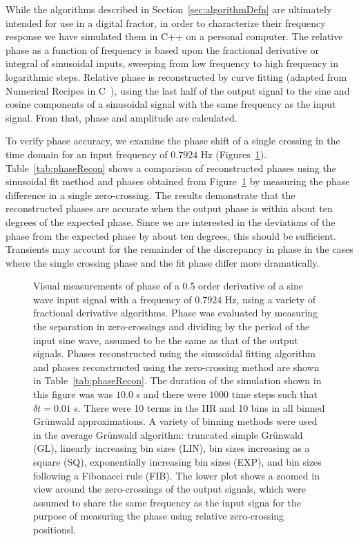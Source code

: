 While the algorithms described in Section~\ref{sec:algorithmDefn} are
ultimately intended for use in a digital fractor, in order to
characterize their frequency response we have simulated them in C++ on a
personal computer. The relative phase as a function of frequency is based upon the
fractional derivative or integral of sinusoidal inputs, sweeping from
low frequency to high frequency in logarithmic steps. Relative phase
is reconstructed by curve fitting (adapted from Numerical Recipes in C~\cite{Press:92}), using the last
half of the output signal to the sine and cosine components of a
sinusoidal signal with the same frequency as the input signal. From that, phase and amplitude are calculated.

To verify phase accuracy, we examine the phase shift of a single
crossing in the time domain for an input frequency of $0.7924$ Hz
(Figures~\ref{fig:timeDomain}). Table~\ref{tab:phaseRecon}
shows a comparison of reconstructed phases using the sinusoidal fit
method and phases obtained from Figure~\ref{fig:timeDomain} by
measuring the phase difference in a single zero-crossing. The results demonstrate that the reconstructed phases are accurate when the output phase is within about ten degrees of the expected phase. Since we are interested in the deviations of the phase from the expected phase by about ten degrees, this should be sufficient. Transients may account for the remainder of the discrepancy in phase in the cases where the single crossing phase and the fit phase differ more dramatically. 


\begin{figure}
\caption{Visual measurements of phase of a $0.5$ order derivative of a sine wave input signal with a frequency of $0.7924$ Hz, using a variety of fractional derivative algorithms. Phase was evaluated by measuring the separation in zero-crossings and dividing by the period of the input sine wave, assumed to be the same as that of the output signals. Phases reconstructed using the sinusoidal fitting algorithm and phases reconstructed using the zero-crossing method are shown in Table~\ref{tab:phaseRecon}. The duration of the simulation shown in this figure was 
  was $10.0$ s and there were $1000$ time steps such that $\delta t=0.01$ s. There were 10 terms
  in the IIR and 10 bins in all binned Gr{\"u}nwald approximations. A
  variety of binning methods were used in the average Gr{\"u}nwald algorithm: truncated simple Gr{\"u}nwald
  (GL), linearly increasing bin sizes (LIN), bin sizes increasing as a
  square (SQ), exponentially increasing bin sizes (EXP), and bin sizes
  following a Fibonacci rule (FIB). The lower plot shows a zoomed in view around the zero-crossings of the output signals, which were assumed to share the same frequency as the input signa for the purpose of measuring the phase using relative zero-crossing positionsl.}
\label{fig:timeDomain}
\end{figure}

